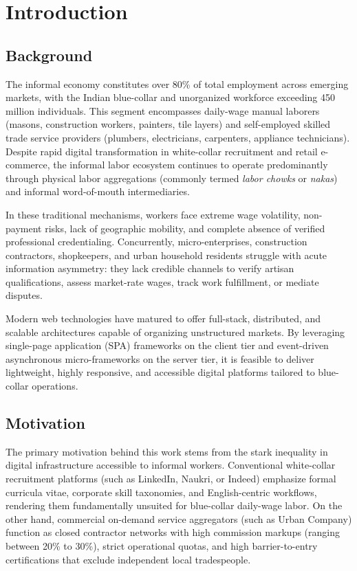 \newpage
\chapter{Introduction}

\section{Background}
The informal economy constitutes over 80\% of total employment across emerging markets, with the Indian blue-collar and unorganized workforce exceeding 450 million individuals. This segment encompasses daily-wage manual laborers (masons, construction workers, painters, tile layers) and self-employed skilled trade service providers (plumbers, electricians, carpenters, appliance technicians). Despite rapid digital transformation in white-collar recruitment and retail e-commerce, the informal labor ecosystem continues to operate predominantly through physical labor aggregations (commonly termed \textit{labor chowks} or \textit{nakas}) and informal word-of-mouth intermediaries.

In these traditional mechanisms, workers face extreme wage volatility, non-payment risks, lack of geographic mobility, and complete absence of verified professional credentialing. Concurrently, micro-enterprises, construction contractors, shopkeepers, and urban household residents struggle with acute information asymmetry: they lack credible channels to verify artisan qualifications, assess market-rate wages, track work fulfillment, or mediate disputes.

Modern web technologies have matured to offer full-stack, distributed, and scalable architectures capable of organizing unstructured markets. By leveraging single-page application (SPA) frameworks on the client tier and event-driven asynchronous micro-frameworks on the server tier, it is feasible to deliver lightweight, highly responsive, and accessible digital platforms tailored to blue-collar operations.

\section{Motivation}
The primary motivation behind this work stems from the stark inequality in digital infrastructure accessible to informal workers. Conventional white-collar recruitment platforms (such as LinkedIn, Naukri, or Indeed) emphasize formal curricula vitae, corporate skill taxonomies, and English-centric workflows, rendering them fundamentally unsuited for blue-collar daily-wage labor. On the other hand, commercial on-demand service aggregators (such as Urban Company) function as closed contractor networks with high commission markups (ranging between 20\% to 30\%), strict operational quotas, and high barrier-to-entry certifications that exclude independent local tradespeople.

